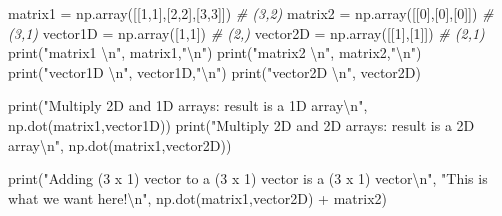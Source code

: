 \documentclass[11pt]{article}
\newenvironment{Shaded}{}{}
\newcommand{\DecValTok}[1]{\textcolor[rgb]{0.25,0.63,0.44}{{#1}}}
\newcommand{\CharTok}[1]{\textcolor[rgb]{0.25,0.44,0.63}{{#1}}}
\newcommand{\StringTok}[1]{\textcolor[rgb]{0.25,0.44,0.63}{{#1}}}
\newcommand{\CommentTok}[1]{\textcolor[rgb]{0.38,0.63,0.69}{\textit{{#1}}}}
\newcommand{\NormalTok}[1]{{#1}}
\newcommand{\OperatorTok}[1]{\textcolor[rgb]{0.40,0.40,0.40}{{#1}}}
\newcommand{\BuiltInTok}[1]{{#1}}
\begin{document}
\begin{Shaded}
\begin{Highlighting}[]
\NormalTok{matrix1 }\OperatorTok{=}\NormalTok{ np.array([[}\DecValTok{1}\NormalTok{,}\DecValTok{1}\NormalTok{],[}\DecValTok{2}\NormalTok{,}\DecValTok{2}\NormalTok{],[}\DecValTok{3}\NormalTok{,}\DecValTok{3}\NormalTok{]]) }\CommentTok{\# (3,2)}
\NormalTok{matrix2 }\OperatorTok{=}\NormalTok{ np.array([[}\DecValTok{0}\NormalTok{],[}\DecValTok{0}\NormalTok{],[}\DecValTok{0}\NormalTok{]]) }\CommentTok{\# (3,1) }
\NormalTok{vector1D }\OperatorTok{=}\NormalTok{ np.array([}\DecValTok{1}\NormalTok{,}\DecValTok{1}\NormalTok{]) }\CommentTok{\# (2,) }
\NormalTok{vector2D }\OperatorTok{=}\NormalTok{ np.array([[}\DecValTok{1}\NormalTok{],[}\DecValTok{1}\NormalTok{]]) }\CommentTok{\# (2,1)}
\BuiltInTok{print}\NormalTok{(}\StringTok{"matrix1 }\CharTok{\textbackslash{}n}\StringTok{"}\NormalTok{, matrix1,}\StringTok{"}\CharTok{\textbackslash{}n}\StringTok{"}\NormalTok{)}
\BuiltInTok{print}\NormalTok{(}\StringTok{"matrix2 }\CharTok{\textbackslash{}n}\StringTok{"}\NormalTok{, matrix2,}\StringTok{"}\CharTok{\textbackslash{}n}\StringTok{"}\NormalTok{)}
\BuiltInTok{print}\NormalTok{(}\StringTok{"vector1D }\CharTok{\textbackslash{}n}\StringTok{"}\NormalTok{, vector1D,}\StringTok{"}\CharTok{\textbackslash{}n}\StringTok{"}\NormalTok{)}
\BuiltInTok{print}\NormalTok{(}\StringTok{"vector2D }\CharTok{\textbackslash{}n}\StringTok{"}\NormalTok{, vector2D)}
\end{Highlighting}
\end{Shaded}

\begin{Shaded}
\begin{Highlighting}[]
\BuiltInTok{print}\NormalTok{(}\StringTok{"Multiply 2D and 1D arrays: result is a 1D array}\CharTok{\textbackslash{}n}\StringTok{"}\NormalTok{, }
\NormalTok{      np.dot(matrix1,vector1D))}
\BuiltInTok{print}\NormalTok{(}\StringTok{"Multiply 2D and 2D arrays: result is a 2D array}\CharTok{\textbackslash{}n}\StringTok{"}\NormalTok{, }
\NormalTok{      np.dot(matrix1,vector2D))}
\end{Highlighting}
\end{Shaded}

\begin{Shaded}
\begin{Highlighting}[]
\BuiltInTok{print}\NormalTok{(}\StringTok{"Adding (3 x 1) vector to a (3 x 1) vector is a (3 x 1) vector}\CharTok{\textbackslash{}n}\StringTok{"}\NormalTok{,}
      \StringTok{"This is what we want here!}\CharTok{\textbackslash{}n}\StringTok{"}\NormalTok{, }
\NormalTok{      np.dot(matrix1,vector2D) }\OperatorTok{+}\NormalTok{ matrix2)}
\end{Highlighting}
\end{Shaded}
\end{document}
